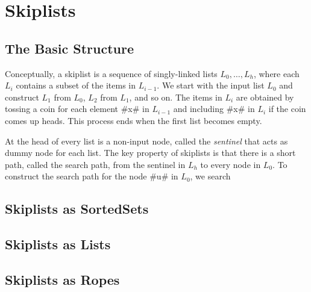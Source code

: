 \chapter{Skiplists}

\section{The Basic Structure}

Conceptually, a skiplist is a sequence of singly-linked lists
$L_0,\ldots,L_h$, where each $L_i$ contains a subset of the items in
$L_{i-1}$.  We start with the input list $L_0$ and construct $L_1$ from
$L_0$, $L_2$ from $L_1$, and so on.  The items in $L_i$ are obtained
by tossing a coin for each element #x# in $L_{i-1}$ and including #x#
in $L_i$ if the coin comes up heads.  This process ends when the first
list becomes empty.

At the head of every list is a non-input node, called the \emph{sentinel}
that acts as dummy node for each list.  The key property of skiplists
is that there is a short path, called the search path, from the sentinel
in $L_h$ to every node in $L_0$.  To construct the search path for the node
#u# in $L_0$, we search 




\section{Skiplists as SortedSets}
\section{Skiplists as Lists}
\section{Skiplists as Ropes}


